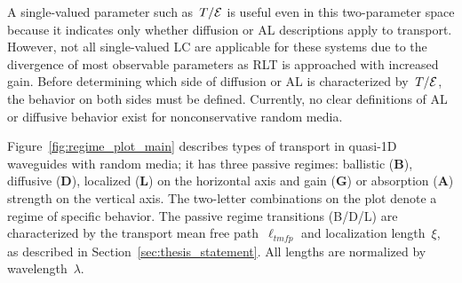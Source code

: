 A single-valued parameter such as~$T/{\cal E}$ is useful even in this two-parameter space because it indicates only whether diffusion or AL descriptions apply to transport. However, not all single-valued LC are applicable for these systems due to the divergence of most observable parameters as RLT is approached with increased gain. Before determining which side of diffusion or AL is characterized by~$T/{\cal E}$, the behavior on both sides must be defined. Currently, no clear definitions of AL or diffusive behavior exist for nonconservative random media.

Figure~\ref{fig:regime_plot_main} describes types of transport in quasi-1D waveguides with random media; it has three passive regimes: ballistic (\textbf{B}), diffusive (\textbf{D}), localized (\textbf{L}) on the horizontal axis and gain (\textbf{G}) or absorption (\textbf{A}) strength on the vertical axis. The two-letter combinations on the plot denote a regime of specific behavior. The passive regime transitions (B/D/L) are characterized by the transport mean free path~$\ell_{tmfp}$ and localization length~$\xi$, as described in Section~\ref{sec:thesis_statement}. All lengths are normalized by wavelength~$\lambda$. 

